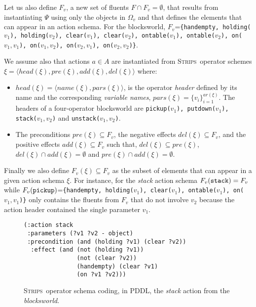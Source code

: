 \documentclass{article}
\newcommand{\tup}[1]{{\langle #1 \rangle}}
\newcommand{\strips}{\textsc{Strips}}     %
\begin{document}
Let us also define $F_v$, a new set of fluents $F\cap F_v=\emptyset$, that results from instantiating $\Psi$ using only the objects in $\Omega_v$ and that defines the elements that can appear in an action schema. For the blocksworld, $F_v$={\small\tt\{handempty, holding($v_1$), holding($v_2$), clear($v_1$), clear($v_2$), ontable($v_1$), ontable($v_2$), on($v_1,v_1$), on($v_1,v_2$), on($v_2,v_1$), on($v_2,v_2$)\}}.

We assume also that actions $a\in A$ are instantiated from \strips\ operator schemes $\xi=\tup{head(\xi),pre(\xi),add(\xi),del(\xi)}$ where:
\begin{itemize}
\item $head(\xi)=\tup{name(\xi),pars(\xi)}$, is the operator {\em header} defined by its name and the corresponding {\em variable names}, $pars(\xi)=\{v_i\}_{i=1}^{ar(\xi)}$. The headers of a four-operator blocksworld are {\small\tt pickup($v_1$), putdown($v_1$), stack($v_1,v_2$)} and {\small\tt unstack($v_1,v_2$)}.
\item The preconditions $pre(\xi)\subseteq F_v$, the negative effects $del(\xi)\subseteq F_v$, and the positive effects $add(\xi)\subseteq F_v$ such that, $del(\xi)\subseteq pre(\xi)$, $del(\xi)\cap add(\xi)=\emptyset$ and $pre(\xi)\cap add(\xi)=\emptyset$.
\end{itemize}

Finally we also define $F_v(\xi)\subseteq F_v$ as the subset of elements that can appear in a given action schema $\xi$. For instance, for the {\em stack} action schema $F_v({\tt stack})=F_v$ while $F_v({\tt pickup})$={\small\tt\{handempty, holding($v_1$), clear($v_1$), ontable($v_1$), on($v_1,v_1$)\}} only contains the fluents from $F_v$ that do not involve $v_2$ because the action header contained the single parameter $v_1$.


\begin{figure}
\begin{footnotesize}
\begin{verbatim}
(:action stack
 :parameters (?v1 ?v2 - object)
 :precondition (and (holding ?v1) (clear ?v2))
  :effect (and (not (holding ?v1)) 
               (not (clear ?v2))
               (handempty) (clear ?v1) 
               (on ?v1 ?v2)))
\end{verbatim}
\end{footnotesize}
 \caption{\small \strips\ operator schema coding, in PDDL, the {\em stack} action from the {\em blocksworld}.}
\label{fig:stack}
\end{figure}
\end{document}

